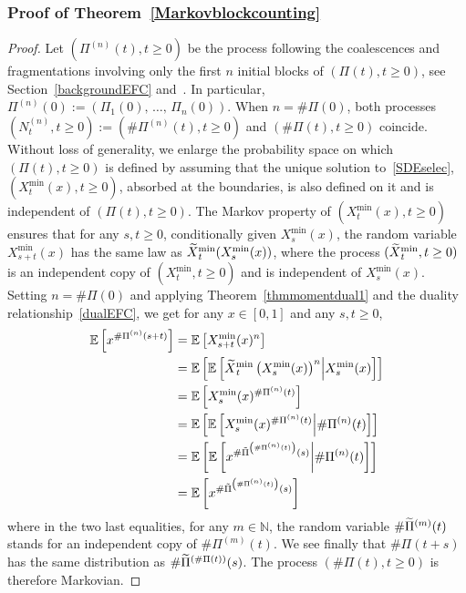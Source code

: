 \documentclass[AHL,Unicode,longabstracts,published]{cedram}
\newcommand{\bbN}{\mathbb{N}}
\newcommand{\bbE}{\mathbb{E}}
\let\oldtilde\tilde
\renewcommand*{\tilde}[1]{\mathchoice{\widetilde{#1}}{\widetilde{#1}}{\oldtilde{#1}}{\oldtilde{#1}}}
\begin{document}
\subsubsection{Proof of Theorem~\ref{Markovblockcounting}}

\begin{proof}
Let $(\Pi^{(n)}(t),t\geq 0)$ be the process following the coalescences and fragmentations involving only the first $n$ initial blocks of $(\Pi(t),t\geq 0)$, see Section~\ref{backgroundEFC} and~\cite[Lemma~3.3 and Lemma~3.4]{cdiEFC}. In particular, $\Pi^{(n)}(0):=(\Pi_1(0),\,\ldots,\,\Pi_n(0))$. When $n=\#\Pi(0)$, both processes $(N_t^{(n)},t\geq 0):=(\#\Pi^{(n)}(t),t\geq 0)$ and $(\#\Pi(t),t\geq 0)$ coincide. Without loss of generality, we enlarge the probability space on which $(\Pi(t),t\geq 0)$ is defined by assuming that the unique solution to~\eqref{SDEselec}, $(X_t^{\min}(x),t\geq 0)$, absorbed at the boundaries, is also defined on it and is independent of $(\Pi(t),t\geq 0)$. The Markov property of $(X_t^{\min}(x),t\geq 0)$ ensures that for any $s,t\geq 0$, conditionally given $X^{\min}_s(x)$, the random variable $X_{s+t}^{\min}(x)$ has the same law as $\tilde{X}_t^{\min}(X_{s}^{\min}(x))$, where the process $(\tilde{X}_t^{\min},t\geq 0)$ is an independent copy of $(X_t^{\min},t\geq 0)$ and is independent of $X_s^{\min}(x)$. Setting $n=\#\Pi(0)$ and applying Theorem~\ref{thmmomentdual1} and the duality relationship~\eqref{dualEFC}, we get for any $x\in [0,1]$ and any $s,t\geq 0$,
\begin{align*}
\bbE\left[x^{\#\Pi^{(n)}(s+t)}\right]&=\bbE\left[X_{s+t}^{\min}(x)^{n}\right]\\
&=\bbE\left[\bbE\left[\tilde{X}_{t}^{\min}\left(X_{s}^{\min}(x)\right)^{n}\middle|X_{s}^{\min}(x)\right]\right]\\
&=\bbE\left[X_s^{\min}(x)^{\#\Pi^{(n)}(t)}\right]\\
&=\bbE\left[\bbE\left[X_s^{\min}(x)^{\#\Pi^{(n)}(t)}\middle|\#\Pi^{(n)}(t)\right]\right]\\
&=\bbE\left[\bbE\left[x^{\#\tilde{\Pi}^{\left(\#\Pi^{(n)}(t)\right)}(s)}\middle|\#\Pi^{(n)}(t)\right]\right]\\
&=\bbE\left[x^{\#\tilde{\Pi}^{\left(\#\Pi^{(n)}(t)\right)}(s)}\right]
\end{align*}
where in the two last equalities, for any $m\in \bbN$, the random variable $\#\tilde{\Pi}^{(m)}(t)$ stands for an independent copy of $\#\Pi^{(m)}(t)$. We see finally that $\#\Pi(t+s)$ has the same distribution as $\#\tilde{\Pi}^{(\#\Pi(t))}(s)$. The process $(\#\Pi(t),t\geq 0)$ is therefore Markovian.


\end{proof}
\end{document}
